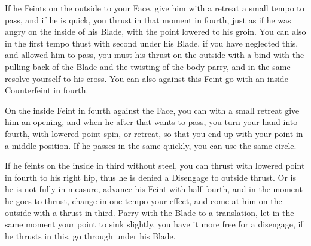 If he Feints on the outside to your Face, give him with a retreat a
small tempo to pass, and if he is quick, you thrust in that moment in
fourth, just as if he was angry on the inside of his Blade, with the
point lowered to his groin. You can also in the first tempo thust with
second under his Blade, if you have neglected this, and allowed him to
pass, you must his thrust on the outside with a bind with the pulling
back of the Blade and the twisting of the body parry, and in the same
resolve yourself to his cross. You can also against this Feint go with an
inside Counterfeint in fourth.


On the inside Feint in fourth against the Face, you can with a small
retreat give him an opening, and when he after that wants to pass, you
turn your hand into fourth, with lowered point spin, or retreat, so
that you end up with your point in a middle position. If he passes in
the same quickly, you can use the same circle.


If he feints on the inside in third without steel, you can thrust with
lowered point in fourth to his right hip, thus he is denied a
Disengage to outside thrust. Or is he is not fully in measure,
advance his Feint with half fourth, and in the moment he goes to
thrust, change in one tempo your effect, and come at him on the
outside with a thrust in third. Parry with the Blade to a translation,
let in the same moment your point to sink slightly, you have it more
free for a disengage, if he thrusts in this, go through under his Blade.
